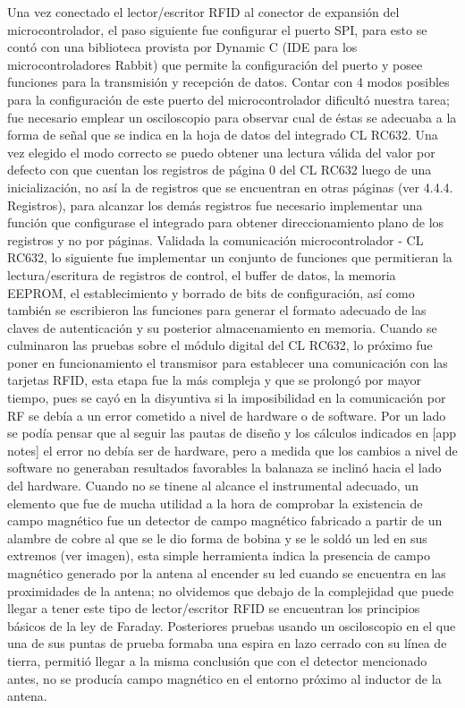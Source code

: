 Una vez conectado el lector/escritor RFID al conector de expansión del microcontrolador, el paso siguiente fue configurar el puerto SPI, para esto se contó con una biblioteca provista por Dynamic C (IDE para los microcontroladores Rabbit) que permite la configuración del puerto y posee funciones para la transmisión y recepción de datos. Contar con 4 modos posibles para la configuración de este puerto del microcontrolador dificultó nuestra tarea; fue necesario emplear un osciloscopio para observar cual de éstas se adecuaba a la forma de señal que se indica en la hoja de datos del integrado  CL RC632. Una vez elegido el modo correcto se puedo obtener una lectura válida del valor por defecto con que cuentan los registros de página 0 del CL RC632 luego de una inicialización, no así la de registros que se encuentran en otras páginas (ver 4.4.4. Registros), para alcanzar los demás registros fue necesario implementar una función que configurase el integrado para obtener direccionamiento plano de los registros y no por páginas.
Validada la comunicación microcontrolador - CL RC632, lo siguiente fue implementar un conjunto de funciones que permitieran la lectura/escritura de registros de control, el buffer de datos, la memoria EEPROM, el establecimiento y borrado de bits de configuración, así como también se escribieron las funciones para generar el formato adecuado de las claves de autenticación y su posterior almacenamiento en memoria. 
Cuando se culminaron las pruebas sobre el módulo digital del  CL RC632, lo próximo fue poner en funcionamiento el transmisor para establecer una comunicación con las tarjetas RFID, esta etapa fue la más compleja y que se prolongó por mayor tiempo, pues se cayó en la disyuntiva si la imposibilidad en la comunicación por RF se debía a un error cometido a nivel de hardware o de software. Por un lado se podía pensar que al seguir las pautas de diseño y los cálculos indicados en [app notes] el error no debía ser de hardware, pero a medida que los cambios a nivel de software no generaban resultados favorables la balanaza se inclinó hacia el lado del hardware. Cuando no se tinene al alcance el instrumental adecuado, un elemento que fue de mucha utilidad a la hora de comprobar la existencia de campo magnético fue un detector de campo magnético fabricado a partir de un alambre de cobre al que se le dio forma de bobina y se le soldó un led en sus extremos (ver imagen), esta simple herramienta indica la presencia de campo magnético generado por la antena al encender su led cuando se encuentra en las proximidades de la antena; no olvidemos que debajo de la complejidad que puede llegar a tener este tipo de lector/escritor RFID se encuentran los principios básicos de la ley de Faraday.  Posteriores pruebas usando un osciloscopio en el que una de sus puntas de prueba formaba una espira en lazo cerrado con su línea de tierra, permitió llegar a la misma conclusión que con el detector mencionado antes, no se producía campo magnético en el entorno próximo al inductor de la antena.  
